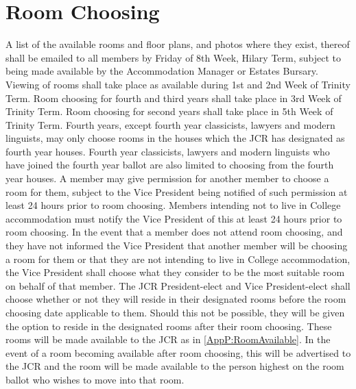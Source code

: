 \section{Room Choosing}
\appnpara A list of the available rooms and floor plans, and photos where they exist, thereof shall be emailed to all members by Friday of 8th Week, Hilary Term, subject to being made available by the Accommodation Manager or Estates Bursary.
\appnpara Viewing of rooms shall take place as available during 1st and 2nd Week of Trinity Term.
\appnpara Room choosing for fourth and third years shall take place in 3rd Week of Trinity Term.
\appnpara Room choosing for second years shall take place in 5th Week of Trinity Term.
\appnpara Fourth years, except fourth year classicists, lawyers and modern linguists, may only choose rooms in the houses which the JCR has designated as fourth year houses. Fourth year classicists, lawyers and modern linguists who have joined the fourth year ballot are also limited to choosing from the fourth year houses.
\appnpara A member may give permission for another member to choose a room for them, subject to the Vice President being notified of such permission at least 24 hours prior to room choosing.
\appnpara Members intending not to live in College accommodation must notify the Vice President of this at least 24 hours prior to room choosing.
\appnpara In the event that a member does not attend room choosing, and they have not informed the Vice President that another member will be choosing a room for them or that they are not intending to live in College accommodation, the Vice President shall choose what they consider to be the most suitable room on behalf of that member.
\appnpara The JCR President-elect and Vice President-elect shall choose whether or not they will reside in their designated rooms before the room choosing date applicable to them. Should this not be possible, they will be given the option to reside in the designated rooms after their room choosing. These rooms will be made available to the JCR as in \ref{AppP:RoomAvailable}.
\appnpara \label{AppP:RoomAvailable} In the event of a room becoming available after room choosing, this will be advertised to the JCR and the room will be made available to the person highest on the room ballot who wishes to move into that room.
